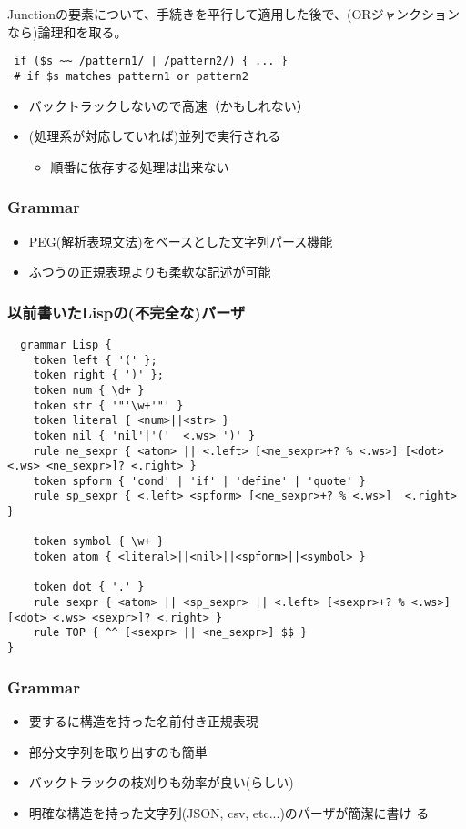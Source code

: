 \documentclass[14pt,dvipdfm,trans]{beamer}
\begin{document}
\begin{frame}[fragile]
 Junctionの要素について、手続きを平行して適用した後で、(ORジャンクション
 なら)論理和を取る。
 \vspace*{1zh}
\begin{lstlisting}
 if ($s ~~ /pattern1/ | /pattern2/) { ... }
 # if $s matches pattern1 or pattern2
\end{lstlisting}

\begin{itemize}
 \item バックトラックしないので高速（かもしれない）
 \item (処理系が対応していれば)並列で実行される
       \begin{itemize}
	\item 順番に依存する処理は出来ない
       \end{itemize}
\end{itemize}
\end{frame}

\begin{frame}
 \frametitle{Grammar}
\begin{itemize}
 \item PEG(解析表現文法)をベースとした文字列パース機能
 \item ふつうの正規表現よりも柔軟な記述が可能
\end{itemize}
\end{frame}

\begin{frame}[fragile]
\frametitle{以前書いたLispの(不完全な)パーザ}
 \begin{lstlisting}
  grammar Lisp {
    token left { '(' };
    token right { ')' };
    token num { \d+ }
    token str { '"'\w+'"' }
    token literal { <num>||<str> }
    token nil { 'nil'|'('  <.ws> ')' }
    rule ne_sexpr { <atom> || <.left> [<ne_sexpr>+? % <.ws>] [<dot> <.ws> <ne_sexpr>]? <.right> }
    token spform { 'cond' | 'if' | 'define' | 'quote' }
    rule sp_sexpr { <.left> <spform> [<ne_sexpr>+? % <.ws>]  <.right> }

    token symbol { \w+ }
    token atom { <literal>||<nil>||<spform>||<symbol> }

    token dot { '.' }
    rule sexpr { <atom> || <sp_sexpr> || <.left> [<sexpr>+? % <.ws>] [<dot> <.ws> <sexpr>]? <.right> }
    rule TOP { ^^ [<sexpr> || <ne_sexpr>] $$ }
}
 \end{lstlisting}
\end{frame}

\begin{frame}
\frametitle{Grammar}
 \begin{itemize}
  \item 要するに構造を持った名前付き正規表現
  \item 部分文字列を取り出すのも簡単
  \item バックトラックの枝刈りも効率が良い(らしい)
  \item 明確な構造を持った文字列(JSON, csv, etc...)のパーザが簡潔に書け
	る
 \end{itemize}
\end{frame}
\end{document}
